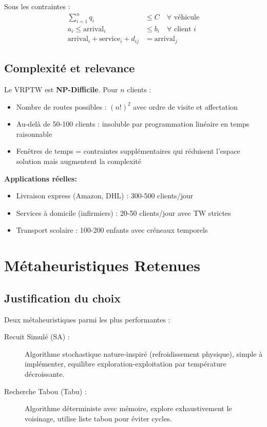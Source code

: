 \documentclass[12pt,a4paper,twoside]{report}
\begin{document}
Sous les contraintes :
\begin{align}
    \sum_{i=1}^{n} q_i                           & \leq C \quad \forall \text{ véhicule} \label{eq:capacity}      \\
    a_i \leq \text{arrival}_i                    & \leq b_i \quad \forall \text{ client } i \label{eq:timewindow} \\
    \text{arrival}_i + \text{service}_i + d_{ij} & = \text{arrival}_j \label{eq:timeflow}
\end{align}

\subsection{Complexité et relevance}

Le VRPTW est \textbf{NP-Difficile}. Pour $n$ clients :
\begin{itemize}
    \item Nombre de routes possibles : $(n!)^2$ avec ordre de visite et affectation
    \item Au-delà de 50-100 clients : insoluble par programmation linéaire en temps
          raisonnable
    \item Fenêtres de temps = contraintes supplémentaires qui réduisent l'espace solution
          mais augmentent la complexité
\end{itemize}

\textbf{Applications réelles:}
\begin{itemize}
    \item Livraison express (Amazon, DHL) : 300-500 clients/jour
    \item Services à domicile (infirmiers) : 20-50 clients/jour avec TW strictes
    \item Transport scolaire : 100-200 enfants avec créneaux temporels
\end{itemize}

\section{Métaheuristiques Retenues}

\subsection{Justification du choix}

Deux métaheuristiques parmi les plus performantes :

\begin{description}
    \item[Recuit Simulé (SA) :] Algorithme stochastique nature-inspiré (refroidissement
          physique), simple à implémenter, equilibre exploration-exploitation par
          température décroissante.

    \item[Recherche Tabou (Tabu) :] Algorithme déterministe avec mémoire, explore
          exhaustivement le voisinage, utilise liste tabou pour éviter cycles.
\end{description}
\end{document}
